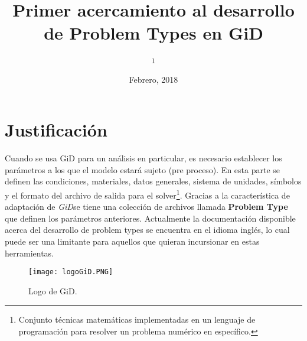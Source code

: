 \documentclass[10pt, a4paper, twocolumn]{article} %
\title{Primer acercamiento al desarrollo de Problem Types en GiD} %
\author{
	\authorstyle{Luis G. Yáñez Rodríguez\textsuperscript{1}} %
	\newline\newline %
	\textsuperscript{1}\institution{[Aula CIMNE UG] Universidad de Guanajuato, Guanajuato, México}\\ %
}
\date{Febrero, 2018} %
\begin{document}
\maketitle %

\thispagestyle{firstpage} %



\section{Justificación}

Cuando se usa GiD para un análisis en particular, es necesario establecer los parámetros a los que el modelo estará sujeto (pre proceso). En esta parte se definen las condiciones, materiales, datos generales, sistema de unidades, símbolos y el formato del archivo de salida para el solver\footnote{Conjunto técnicas matemáticas implementadas en un lenguaje de programación para resolver un problema numérico en específico.}. Gracias a la característica de adaptación de \textit{GiD}se tiene una colección de archivos llamada \textbf{Problem Type} que definen los parámetros anteriores. Actualmente la documentación disponible acerca del desarrollo de problem types se encuentra en el idioma inglés, lo cual puede ser una limitante para aquellos que quieran incursionar en estas herramientas. 

\begin{figure}[hbt!]\centering
	\texttt{[image: logoGiD.PNG]}
	\caption{Logo de GiD.}
\end{figure}
\end{document}
